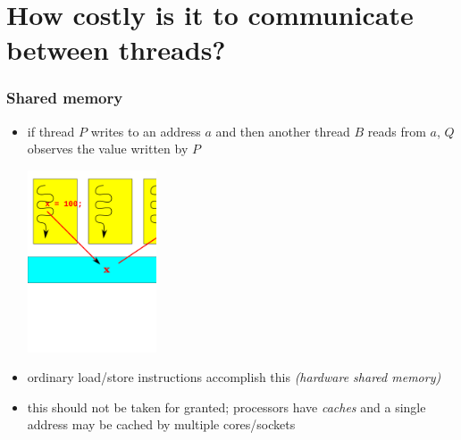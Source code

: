 \documentclass[12pt,dvipdfmx]{beamer}
\newcommand{\ao}[1]{{\color{blue}#1}}
\begin{document}
\section{How costly is it to communicate between threads?}

\begin{frame}
\frametitle{Shared memory}
\begin{itemize}
\item if thread $P$ writes to an address $a$ 
  and then another thread $B$ reads from $a$,
  $Q$ observes the value written by $P$

\begin{center}
\includegraphics[width=0.3\textwidth]{out/pdf/svg/shmem_programming_easy.pdf}
\end{center}

\item<2-> ordinary load/store instructions accomplish this
  \ao{\em (hardware shared memory)}

\item<2-> this should not be taken for granted;
  processors have {\em caches} and a
  single address may be cached by multiple
  cores/sockets

\end{itemize}
\end{frame}
\end{document}
